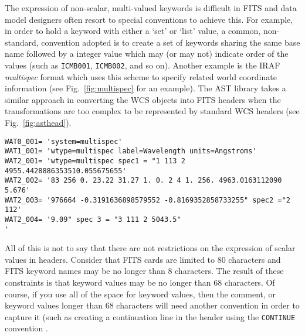 \documentclass[final,authoryear,5p,times,twocolumn]{elsarticle}
\begin{document}
{{The expression of non-scalar, multi-valued keywords is difficult in 
FITS and data model designers often resort to special conventions to 
achieve this. For example, in order to hold a keyword with either a 
`set' or `list' value, a common, non-standard, convention adopted is 
to create a set of keywords sharing the same base name followed by a 
integer value which may (or may not) indicate order of the values 
(such as \texttt{ICMB001}, \texttt{ICMB002}, and so on). Another example 
is the IRAF \textit{multispec} format
\citep[see][and references therein]{1993ASPC...52..467V} which uses
this scheme to specify related world coordinate information (see 
Fig.~\ref{fig:multispec} for an example).  The AST library
\citep[][and see also \S\ref{sec:wcs}]{1998ASPC..145...41W} takes a
similar approach in converting the WCS objects into FITS headers when
the transformations are too complex to be represented by standard WCS
headers (see Fig.~\ref{fig:asthead}).

\begin{figure*}
\begin{minipage}{\textwidth}
\begin{verbatim}
WAT0_001= 'system=multispec'
WAT1_001= 'wtype=multispec label=Wavelength units=Angstroms'
WAT2_001= 'wtype=multispec spec1 = "1 113 2 4955.4428886353510.055675655'
WAT2_002= '83 256 0. 23.22 31.27 1. 0. 2 4 1. 256. 4963.0163112090 5.676'
WAT2_003= '976664 -0.3191636898579552 -0.8169352858733255" spec2 ="2 112'
WAT2_004= '9.09" spec 3 = "3 111 2 5043.5"                              '
\end{verbatim}
\caption{Example header from an IRAF \textit{multispec} data set
  indicating the use of multi-line headers that differs from the
  \texttt{CONTINUE} convention.}
\label{fig:multispec}
\end{minipage}
\end{figure*}

All of this is not to say that there are not restrictions on the expression
of scalar values in headers. Consider that FITS cards are limited to 80 
characters and FITS keyword names may be no longer than 8 characters. The 
result of these constraints is that keyword values may be no longer than 
68 characters. Of course, if you use all of the space for keyword values, 
then the comment, or keyword values longer than 68 characters will need 
another convention in order to capture it (such as creating a continuation
line in the header using the \texttt{CONTINUE} convention \citep{2007Continue}.


}}
\end{document}
